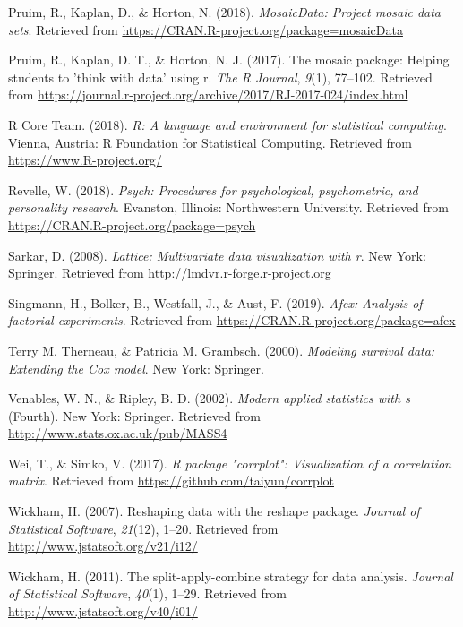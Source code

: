 \documentclass[man]{apa6}
\begin{document}
\leavevmode\hypertarget{ref-R-mosaicData}{}%
Pruim, R., Kaplan, D., \& Horton, N. (2018). \emph{MosaicData: Project mosaic data sets}. Retrieved from \url{https://CRAN.R-project.org/package=mosaicData}

\leavevmode\hypertarget{ref-R-mosaic}{}%
Pruim, R., Kaplan, D. T., \& Horton, N. J. (2017). The mosaic package: Helping students to 'think with data' using r. \emph{The R Journal}, \emph{9}(1), 77--102. Retrieved from \url{https://journal.r-project.org/archive/2017/RJ-2017-024/index.html}

\leavevmode\hypertarget{ref-R-base}{}%
R Core Team. (2018). \emph{R: A language and environment for statistical computing}. Vienna, Austria: R Foundation for Statistical Computing. Retrieved from \url{https://www.R-project.org/}

\leavevmode\hypertarget{ref-R-psych}{}%
Revelle, W. (2018). \emph{Psych: Procedures for psychological, psychometric, and personality research}. Evanston, Illinois: Northwestern University. Retrieved from \url{https://CRAN.R-project.org/package=psych}

\leavevmode\hypertarget{ref-R-lattice}{}%
Sarkar, D. (2008). \emph{Lattice: Multivariate data visualization with r}. New York: Springer. Retrieved from \url{http://lmdvr.r-forge.r-project.org}

\leavevmode\hypertarget{ref-R-afex}{}%
Singmann, H., Bolker, B., Westfall, J., \& Aust, F. (2019). \emph{Afex: Analysis of factorial experiments}. Retrieved from \url{https://CRAN.R-project.org/package=afex}

\leavevmode\hypertarget{ref-R-survival-book}{}%
Terry M. Therneau, \& Patricia M. Grambsch. (2000). \emph{Modeling survival data: Extending the Cox model}. New York: Springer.

\leavevmode\hypertarget{ref-R-MASS}{}%
Venables, W. N., \& Ripley, B. D. (2002). \emph{Modern applied statistics with s} (Fourth). New York: Springer. Retrieved from \url{http://www.stats.ox.ac.uk/pub/MASS4}

\leavevmode\hypertarget{ref-R-corrplot2017}{}%
Wei, T., \& Simko, V. (2017). \emph{R package "corrplot": Visualization of a correlation matrix}. Retrieved from \url{https://github.com/taiyun/corrplot}

\leavevmode\hypertarget{ref-R-reshape2}{}%
Wickham, H. (2007). Reshaping data with the reshape package. \emph{Journal of Statistical Software}, \emph{21}(12), 1--20. Retrieved from \url{http://www.jstatsoft.org/v21/i12/}

\leavevmode\hypertarget{ref-R-plyr}{}%
Wickham, H. (2011). The split-apply-combine strategy for data analysis. \emph{Journal of Statistical Software}, \emph{40}(1), 1--29. Retrieved from \url{http://www.jstatsoft.org/v40/i01/}
\end{document}
